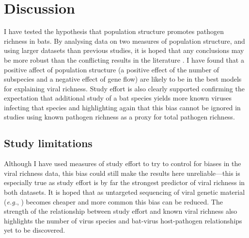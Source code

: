 
\section{Discussion}  



I have tested the hypothesis that population structure promotes pathogen richness in bats.
By analysing data on two measures of population structure, and using larger datasets than previous studies, it is hoped that any conclusions may be more robust than the conflicting results in the literature \cite{gay2014parasite, turmelle2009correlates, maganga2014bat}.
I have found that a positive affect of population structure (a positive effect of the number of subspecies and a negative effect of gene flow) are likely to be in the best models for explaining viral richness.
Study effort is also clearly supported confirming the expectation that additional study of a bat species yields more known viruses infecting that species and highlighting again that this bias cannot be ignored in studies using known pathogen richness as a proxy for total pathogen richness.


\subsection{Study limitations}

Although I have used measures of study effort to try to control for biases in the viral richness data, this bias could still make the results here unreliable---this is especially true as study effort is by far the strongest predictor of viral richness in both datasets.
It is hoped that as untargeted sequencing of viral genetic material (\emph{e.g.}, \textcite{anthony2013strategy}) becomes cheaper and more common this bias can be reduced.
The strength of the relationship between study effort and known viral richness also highlights the number of virus species and bat-virus host-pathogen relationships yet to be discovered.

